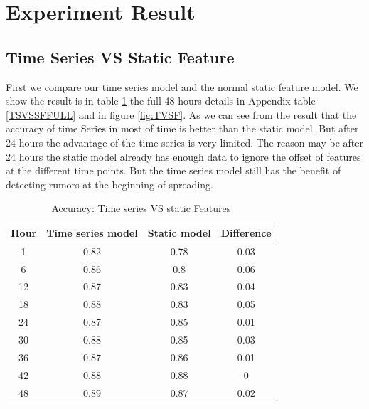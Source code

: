\newpage
  \section{Experiment Result } 
    \subsection{ Time Series VS Static Feature} 

First we compare our time series model and the normal static feature model. We show the result is in table \ref{TVSF} the full 48 hours details in Appendix table \ref{TSVSSFFULL} and in figure \ref{fig:TVSF}. As we can see from the result that the accuracy of time Series in most of time is better than the static model. But after 24 hours the advantage of the time series is very limited. The reason may be after 24 hours the static model already has enough data to ignore the offset of features at the different time points. But the time series model still has the benefit of detecting rumors at the beginning of spreading. 
 
\begin{table}[!h]
\centering
\begin{tabular}{|c|c c |c|}
\hline
Hour & Time series model & Static model & Difference \\ \hline
1    & 0.82              & 0.78         & 0.03       \\
6    & 0.86              & 0.8          & 0.06       \\
12   & 0.87              & 0.83         & 0.04       \\
18   & 0.88              & 0.83         & 0.05       \\
24   & 0.87              & 0.85         & 0.01       \\
30   & 0.88              & 0.85         & 0.03       \\
36   & 0.87              & 0.86         & 0.01          \\
42   & 0.88              & 0.88         & 0          \\
48   & 0.89              & 0.87         & 0.02      \\\hline

\end{tabular}
\caption{Accuracy: Time series VS static Features}
\label{TVSF}
\end{table}

